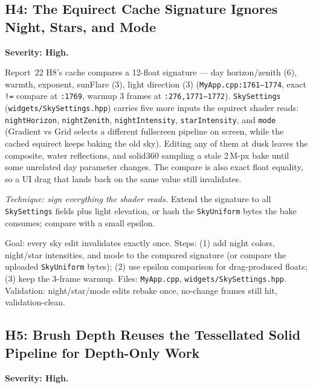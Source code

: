 \documentclass[11pt,a4paper]{article}
\begin{document}
\subsection{H4: The Equirect Cache Signature Ignores Night, Stars, and Mode}
\label{sec:h4}

\textbf{Severity: High.}

Report~22 H8's cache compares a 12-float signature --- day horizon/zenith
(6), warmth, exponent, sunFlare (3), light direction (3)
(\texttt{MyApp.cpp:1761--1774}, exact \texttt{!=} compare at \texttt{:1769},
warmup 3 frames at \texttt{:276,1771--1772}). \texttt{SkySettings}
(\texttt{widgets/SkySettings.hpp}) carries five more inputs the equirect
shader reads: \texttt{nightHorizon}, \texttt{nightZenith},
\texttt{nightIntensity}, \texttt{starIntensity}, and \texttt{mode} (Gradient
vs Grid selects a different fullscreen pipeline on screen, while the cached
equirect keeps baking the old sky). Editing any of them at dusk leaves the
composite, water reflections, and solid360 sampling a stale 2\,M-px bake
until some unrelated day parameter changes. The compare is also exact float
equality, so a UI drag that lands back on the same value still invalidates.

\textit{Technique: sign everything the shader reads.} Extend the signature
to all \texttt{SkySettings} fields plus light elevation, or hash the
\texttt{SkyUniform} bytes the bake consumes; compare with a small epsilon.

\begin{tcolorbox}[promptbox={Prompt --- H4: complete equirect cache signature}]
Goal: every sky edit invalidates exactly once. Steps: (1) add night colors,
night/star intensities, and mode to the compared signature (or compare the
uploaded \texttt{SkyUniform} bytes); (2) use epsilon comparison for
drag-produced floats; (3) keep the 3-frame warmup. Files: \texttt{MyApp.cpp},
\texttt{widgets/SkySettings.hpp}. Validation: night/star/mode edits rebake
once, no-change frames still hit, validation-clean.
\end{tcolorbox}

\subsection{H5: Brush Depth Reuses the Tessellated Solid Pipeline for Depth-Only Work}
\label{sec:h5}

\textbf{Severity: High.}
\end{document}
